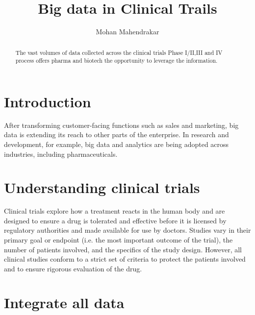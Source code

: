 \documentclass[sigconf]{acmart}
\begin{document}
\title{Big data in Clinical Trails}


\author{Mohan Mahendrakar}

\renewcommand{\shortauthors}{B. Trovato et al.}


\begin{abstract}
The vast volumes of data collected across the clinical trials Phase I/II,III and IV process
offers pharma and biotech the opportunity to leverage the information.
\end{abstract}



\maketitle

\section{Introduction}

After transforming customer-facing functions such as sales and marketing, big data is extending its reach to other parts of the enterprise. In research and development, for example, big data and analytics are being adopted across industries, including pharmaceuticals\cite{Abri0l}.

\section{Understanding clinical trials}
Clinical trials explore how a treatment reacts in the human body and are designed to
ensure a drug is tolerated and effective before it is licensed by regulatory authorities
and made available for use by doctors. Studies vary in their primary goal or endpoint
(i.e. the most important outcome of the trial), the number of patients involved, and the
specifics of the study design. However, all clinical studies conform to a strict set of
criteria to protect the patients involved and to ensure rigorous evaluation of the drug\cite{Abr02}.

\section{Integrate all data}
\end{document}
